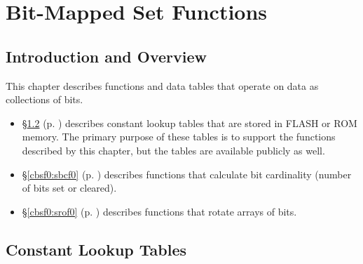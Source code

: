 
\chapter{Bit-Mapped Set Functions}        
\label{cbsf0}

\section{Introduction and Overview}
\label{cbsf0:siov0}

This chapter describes functions and data tables that operate on data
as collections of bits.

\begin{itemize}
\item \S{}\ref{cbsf0:sctb0} (p. \pageref{cbsf0:sctb0})
      describes constant lookup tables that are stored
      in FLASH or ROM memory.  The primary purpose of these tables is
      to support the functions described by this chapter, but the tables
      are available publicly as well.
\item \S{}\ref{cbsf0:sbcf0} (p. \pageref{cbsf0:sbcf0})
      describes functions that calculate
      bit cardinality (number of bits set or cleared).
\item \S{}\ref{cbsf0:srof0} (p. \pageref{cbsf0:srof0})
      describes functions that rotate
      arrays of bits.
\end{itemize}


\section{Constant Lookup Tables}
\label{cbsf0:sctb0}


